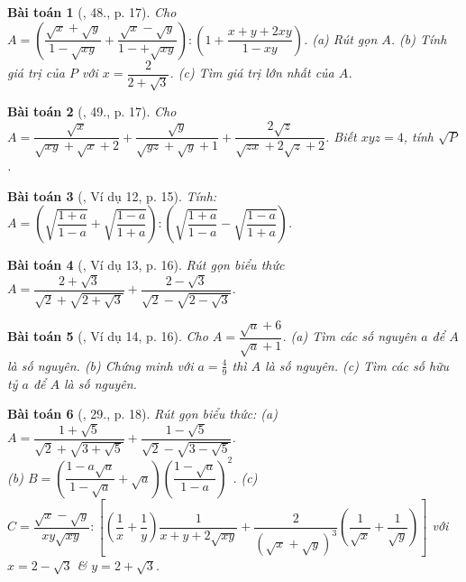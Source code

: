 \documentclass{article}
\newtheorem{baitoan}{Bài toán}
\begin{document}
\begin{baitoan}[\cite{Tuyen_Toan_9}, 48., p. 17]
	Cho $A = \left(\dfrac{\sqrt{x} + \sqrt{y}}{1 - \sqrt{xy}} + \dfrac{\sqrt{x} - \sqrt{y}}{1 -+ \sqrt{xy}}\right):\left(1 + \dfrac{x + y + 2xy}{1 - xy}\right)$. (a) Rút gọn $A$. (b) Tính giá trị của $P$ với $x = \dfrac{2}{2 + \sqrt{3}}$. (c) Tìm giá trị lớn nhất của $A$.
\end{baitoan}

\begin{baitoan}[\cite{Tuyen_Toan_9}, 49., p. 17]
	Cho $A = \dfrac{\sqrt{x}}{\sqrt{xy} + \sqrt{x} + 2} + \dfrac{\sqrt{y}}{\sqrt{yz} + \sqrt{y} + 1} + \dfrac{2\sqrt{z}}{\sqrt{zx} + 2\sqrt{z} + 2}$. Biết $xyz = 4$, tính $\sqrt{P}$.
\end{baitoan}

\begin{baitoan}[\cite{Binh_Toan_9_tap_1}, Ví dụ 12, p. 15]
	Tính: $A = \left(\sqrt{\dfrac{1 + a}{1 - a}} + \sqrt{\dfrac{1 - a}{1 + a}}\right):\left(\sqrt{\dfrac{1 + a}{1 - a}} - \sqrt{\dfrac{1 - a}{1 + a}}\right)$.
\end{baitoan}

\begin{baitoan}[\cite{Binh_Toan_9_tap_1}, Ví dụ 13, p. 16]
	Rút gọn biểu thức $A = \dfrac{2 + \sqrt{3}}{\sqrt{2} + \sqrt{2 + \sqrt{3}}} + \dfrac{2 - \sqrt{3}}{\sqrt{2} - \sqrt{2 - \sqrt{3}}}$.
\end{baitoan}

\begin{baitoan}[\cite{Binh_Toan_9_tap_1}, Ví dụ 14, p. 16]
	Cho $A = \dfrac{\sqrt{a} + 6}{\sqrt{a} + 1}$. (a) Tìm các số nguyên $a$ để $A$ là số nguyên. (b) Chứng minh với $a = \frac{4}{9}$ thì $A$ là số nguyên. (c) Tìm các số hữu tỷ $a$ để $A$ là số nguyên.
\end{baitoan}

\begin{baitoan}[\cite{Binh_Toan_9_tap_1}, 29., p. 18]
	Rút gọn biểu thức: (a) $A = \dfrac{1 + \sqrt{5}}{\sqrt{2} + \sqrt{3 + \sqrt{5}}} + \dfrac{1 - \sqrt{5}}{\sqrt{2} - \sqrt{3 - \sqrt{5}}}$.\\(b) $B = \left(\dfrac{1 - a\sqrt{a}}{1 - \sqrt{a}} + \sqrt{a}\right)\left(\dfrac{1 - \sqrt{a}}{1 - a}\right)^2$. (c) $C = \dfrac{\sqrt{x} - \sqrt{y}}{xy\sqrt{xy}}:\left[\left(\dfrac{1}{x} + \dfrac{1}{y}\right)\dfrac{1}{x + y+ 2\sqrt{xy}} + \dfrac{2}{(\sqrt{x} + \sqrt{y})^3}\left(\dfrac{1}{\sqrt{x}} + \dfrac{1}{\sqrt{y}}\right)\right]$ với $x = 2 - \sqrt{3}$ \& $y = 2 + \sqrt{3}$.
\end{baitoan}
\end{document}
